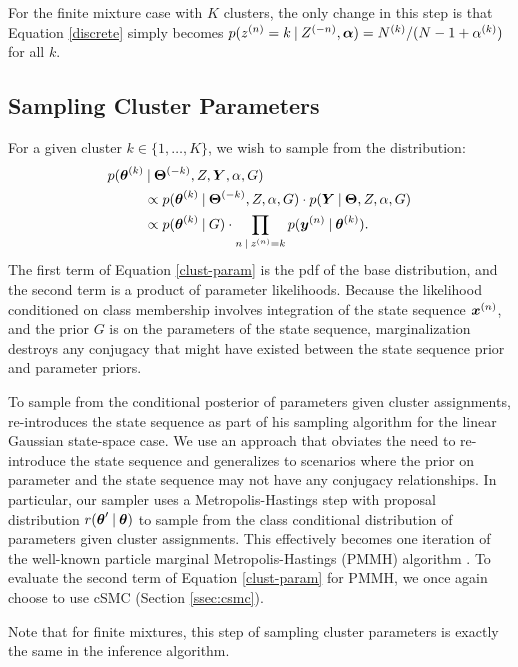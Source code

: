 \documentclass[twoside]{article}
\begin{document}
For the finite mixture case with $K$ clusters, the only change in this step is that Equation \ref{discrete} simply becomes $p({z}^{(n)}_{} = k \:\vert\: {Z}^{(-n)}_{}, \boldsymbol{\alpha}) = {N}^{(k)}_{} / (N - 1 + {\alpha}^{(k)}_{})$ for all $k$.

\subsection{Sampling Cluster Parameters}
For a given cluster $k \in \{1, \ldots, K\}$, we wish to sample from the distribution:
\begin{align}
p(\boldsymbol{\theta}^{(k)}_{} &\:\vert\: \boldsymbol{\Theta}^{(-k)}_{}, Z, \boldsymbol{Y}, \alpha, G) \label{clust-param} \\
&\propto p(\boldsymbol{\theta}^{(k)}_{} \:\vert\: \boldsymbol{\Theta}^{(-k)}_{}, Z, \alpha, G) \cdot p(\boldsymbol{Y} \:\vert\: \boldsymbol{\Theta}, Z, \alpha, G) \nonumber \\
&\propto p(\boldsymbol{\theta}^{(k)}_{}  \:\vert\: G) \cdot \prod_{n \:\vert\: {z}^{(n)}_{} = k} p(\boldsymbol{y}^{(n)}_{} \:\vert\: \boldsymbol{\theta}^{(k)}_{}). \nonumber
\end{align}
The first term of Equation \ref{clust-param} is the pdf of the base distribution, and the second term is a product of parameter likelihoods. Because the likelihood conditioned on class membership involves integration of the state sequence $\boldsymbol{x}^{(n)}_{}$, and the prior $G$ is on the parameters of the state sequence, marginalization destroys any conjugacy that might have existed between the state sequence prior and parameter priors. 

To sample from the conditional posterior of parameters given cluster assignments, \cite{middleton2014} re-introduces the state sequence as part of his sampling algorithm for the linear Gaussian state-space case. %
We use an approach that obviates the need to re-introduce the state sequence and generalizes to scenarios where the prior on parameter and the state sequence may not have any conjugacy relationships. In particular, our sampler uses a Metropolis-Hastings step with proposal distribution $r(\boldsymbol{\theta}' \:\vert\: \boldsymbol{\theta})$ to sample from the class conditional distribution of parameters given cluster assignments. This effectively becomes one iteration of the well-known particle marginal Metropolis-Hastings (PMMH) algorithm \citep{andrieu2010particle}.  To evaluate the second term of Equation \ref{clust-param} for PMMH, we once again choose to use cSMC (Section \ref{ssec:csmc}).   

Note that for finite mixtures, this step of sampling cluster parameters is exactly the same in the inference algorithm.
\end{document}

